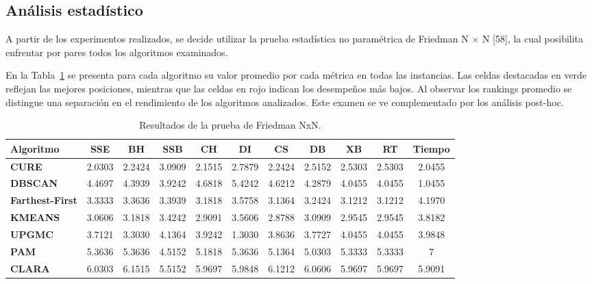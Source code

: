 \subsection{An\'alisis estad\'istico}

A partir de los experimentos realizados, se decide utilizar la prueba estad\'istica no param\'etrica de Friedman N $\times$ N [58], la cual posibilita enfrentar por pares todos los algoritmos examinados.

En la Tabla~\ref{tab:friedman} se presenta para cada algoritmo su valor promedio por cada m\'etrica en todas las instancias. Las celdas destacadas en verde reflejan las mejores posiciones, mientras que las celdas en rojo indican los desempe\~nos m\'as bajos. Al observar los rankings promedio se distingue una separaci\'on en el rendimiento de los algoritmos analizados. Este examen se ve complementado por los an\'alisis post-hoc.

\begin{table}[H]
\centering
\caption{Resultados de la prueba de Friedman NxN.}
\label{tab:friedman}
\footnotesize
\begin{tabular}{@{}lcccccccccc@{}}
\toprule
\textbf{Algoritmo} & \textbf{SSE} & \textbf{BH} & \textbf{SSB} & \textbf{CH} & \textbf{DI} & \textbf{CS} & \textbf{DB} & \textbf{XB} & \textbf{RT} & \textbf{Tiempo} \\
\midrule
\textbf{CURE} & \cellcolor{green!25}2.0303 & \cellcolor{green!25}2.2424 & \cellcolor{green!25}3.0909 & \cellcolor{green!25}2.1515 & 2.7879 & \cellcolor{green!25}2.2424 & \cellcolor{green!25}2.5152 & \cellcolor{green!25}2.5303 & \cellcolor{green!25}2.5303 & 2.0455 \\
\textbf{DBSCAN} & 4.4697 & 4.3939 & 3.9242 & 4.6818 & \cellcolor{red!20}5.4242 & 4.6212 & 4.2879 & 4.0455 & 4.0455 & \cellcolor{green!25}1.0455 \\
\textbf{Farthest-First} & 3.3333 & 3.3636 & 3.3939 & 3.1818 & 3.5758 & 3.1364 & 3.2424 & 3.1212 & 3.1212 & 4.1970 \\
\textbf{KMEANS} & 3.0606 & 3.1818 & 3.4242 & 2.9091 & 3.5606 & 2.8788 & 3.0909 & 2.9545 & 2.9545 & 3.8182 \\
\textbf{UPGMC} & 3.7121 & 3.3030 & 4.1364 & 3.9242 & \cellcolor{green!25}1.3030 & 3.8636 & 3.7727 & 4.0455 & 4.0455 & 3.9848 \\
\textbf{PAM} & 5.3636 & 5.3636 & 4.5152 & 5.1818 & 5.3636 & 5.1364 & 5.0303 & \cellcolor{red!20}5.3333 & \cellcolor{red!20}5.3333 & \cellcolor{red!20}7 \\
\textbf{CLARA} & \cellcolor{red!20}6.0303 & \cellcolor{red!20}6.1515 & \cellcolor{red!20}5.5152 & \cellcolor{red!20}5.9697 & \cellcolor{red!20}5.9848 & \cellcolor{red!20}6.1212 & \cellcolor{red!20}6.0606 & 5.9697 & 5.9697 & 5.9091 \\
\bottomrule
\end{tabular}
\end{table}

